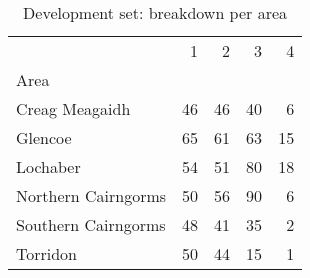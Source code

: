 \begin{table}[H]
\caption{Development set:  breakdown per area}
\label{tbl:sais_mapped_hazard_breakdown_per_area_dev}
\begin{tabular}{lrrrr}
\toprule
 & 1 & 2 & 3 & 4 \\
Area &  &  &  &  \\
\midrule
Creag Meagaidh & 46 & 46 & 40 & 6 \\
Glencoe & 65 & 61 & 63 & 15 \\
Lochaber & 54 & 51 & 80 & 18 \\
Northern Cairngorms & 50 & 56 & 90 & 6 \\
Southern Cairngorms & 48 & 41 & 35 & 2 \\
Torridon & 50 & 44 & 15 & 1 \\
\bottomrule
\end{tabular}
\end{table}
